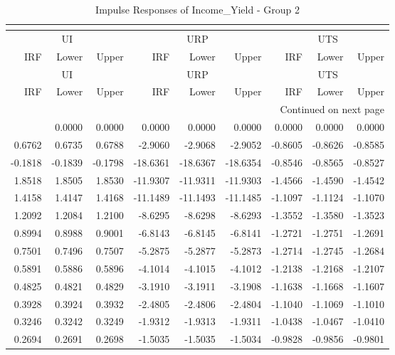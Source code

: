 \begin{longtable}{rrrrrrrrr}
\caption{Impulse Responses of Income_Yield - Group 2}\\
\label{tab:iy_irf_group2}\\
\toprule
\multicolumn{3}{c}{UI} & \multicolumn{3}{c}{URP} & \multicolumn{3}{c}{UTS} \\
IRF & Lower & Upper & IRF & Lower & Upper & IRF & Lower & Upper \\
\midrule
\endfirsthead
\toprule
\multicolumn{3}{c}{UI} & \multicolumn{3}{c}{URP} & \multicolumn{3}{c}{UTS} \\
IRF & Lower & Upper & IRF & Lower & Upper & IRF & Lower & Upper \\
\midrule
\endhead
\midrule
\multicolumn{9}{r}{Continued on next page} \\
\midrule
\endfoot
\bottomrule
\endlastfoot
0.0000 & 0.0000 & 0.0000 & 0.0000 & 0.0000 & 0.0000 & 0.0000 & 0.0000 & 0.0000 \\
0.6762 & 0.6735 & 0.6788 & -2.9060 & -2.9068 & -2.9052 & -0.8605 & -0.8626 & -0.8585 \\
-0.1818 & -0.1839 & -0.1798 & -18.6361 & -18.6367 & -18.6354 & -0.8546 & -0.8565 & -0.8527 \\
1.8518 & 1.8505 & 1.8530 & -11.9307 & -11.9311 & -11.9303 & -1.4566 & -1.4590 & -1.4542 \\
1.4158 & 1.4147 & 1.4168 & -11.1489 & -11.1493 & -11.1485 & -1.1097 & -1.1124 & -1.1070 \\
1.2092 & 1.2084 & 1.2100 & -8.6295 & -8.6298 & -8.6293 & -1.3552 & -1.3580 & -1.3523 \\
0.8994 & 0.8988 & 0.9001 & -6.8143 & -6.8145 & -6.8141 & -1.2721 & -1.2751 & -1.2691 \\
0.7501 & 0.7496 & 0.7507 & -5.2875 & -5.2877 & -5.2873 & -1.2714 & -1.2745 & -1.2684 \\
0.5891 & 0.5886 & 0.5896 & -4.1014 & -4.1015 & -4.1012 & -1.2138 & -1.2168 & -1.2107 \\
0.4825 & 0.4821 & 0.4829 & -3.1910 & -3.1911 & -3.1908 & -1.1638 & -1.1668 & -1.1607 \\
0.3928 & 0.3924 & 0.3932 & -2.4805 & -2.4806 & -2.4804 & -1.1040 & -1.1069 & -1.1010 \\
0.3246 & 0.3242 & 0.3249 & -1.9312 & -1.9313 & -1.9311 & -1.0438 & -1.0467 & -1.0410 \\
0.2694 & 0.2691 & 0.2698 & -1.5035 & -1.5035 & -1.5034 & -0.9828 & -0.9856 & -0.9801 \\
\end{longtable}